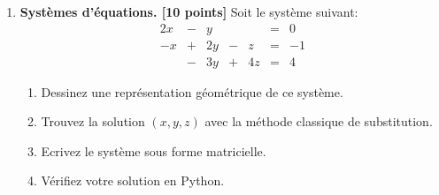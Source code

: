 \documentclass{article}
\begin{document}
\begin{enumerate}
\vspace{1cm}
\item {\bf Systèmes d'équations. [10 points]} Soit le système suivant:
$$
\begin{array}{ccccccc}
2x & - & y  &   &    & = &  0 \\
-x & + & 2y & - & z  & = & -1 \\
   & - & 3y & + & 4z & = &  4
\end{array}
$$
\begin{enumerate}
 \item Dessinez une représentation géométrique de ce système.
 \item Trouvez la solution $(x,y,z)$ avec la méthode 
   classique de substitution.
 \item Ecrivez le système sous forme matricielle.
 \item Vérifiez votre solution en Python.
\end{enumerate}
      



\vspace{1cm}


\end{enumerate}
\end{document}
